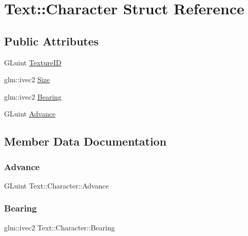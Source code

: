 \hypertarget{structText_1_1Character}{}\section{Text\+:\+:Character Struct Reference}
\label{structText_1_1Character}
\subsection*{Public Attributes}
\begin{DoxyCompactItemize}
\item 
G\+Luint \mbox{\hyperlink{structText_1_1Character_af360b406edc3ed9092ce7e233ae3acc8}{Texture\+ID}}
\item 
glm\+::ivec2 \mbox{\hyperlink{structText_1_1Character_ad4c2b88bfc1232dec53699b361231ca3}{Size}}
\item 
glm\+::ivec2 \mbox{\hyperlink{structText_1_1Character_a2bfdd54e6722da034311bb89e8059336}{Bearing}}
\item 
G\+Luint \mbox{\hyperlink{structText_1_1Character_a654a8be453c9922a74763e5579f6ce61}{Advance}}
\end{DoxyCompactItemize}


\subsection{Member Data Documentation}
\mbox{\label{structText_1_1Character_a654a8be453c9922a74763e5579f6ce61}} 
\subsubsection{\texorpdfstring{Advance}{Advance}}
{\footnotesize\ttfamily G\+Luint Text\+::\+Character\+::\+Advance}

\mbox{\label{structText_1_1Character_a2bfdd54e6722da034311bb89e8059336}} 
\subsubsection{\texorpdfstring{Bearing}{Bearing}}
{\footnotesize\ttfamily glm\+::ivec2 Text\+::\+Character\+::\+Bearing}

